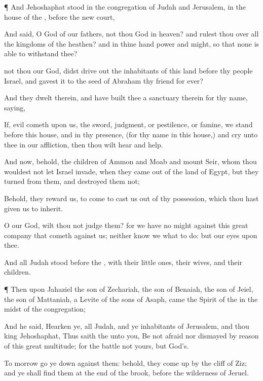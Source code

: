 {\par }{\PP {}¶ And
Jehoshaphat
stood in the
congregation of
Judah and
Jerusalem, in the
house of the
{},
before the
new
court,

And
said, O
{}
God of our
fathers,
{} not thou
God in
heaven? and
rulest
{} thou over all the
kingdoms of the
heathen? and in thine
hand
{}
power and
might, so that none is able to
withstand thee?

 not thou our
God,
{} didst drive
out the
inhabitants of this
land
before thy
people
Israel, and
gavest it to the
seed of
Abraham thy
friend for
ever?

And they
dwelt therein, and have
built thee a
sanctuary therein for thy
name,
saying,

If,
{}
evil
cometh upon us,
{} the
sword,
judgment, or
pestilence, or
famine, we
stand
before this
house, and in thy
presence, (for thy
name
{} in this
house,) and
cry unto thee in our
affliction, then thou wilt
hear and
help.

And now, behold, the
children of
Ammon and
Moab and
mount
Seir, whom thou wouldest not
let
Israel
invade, when they came
out of the
land of
Egypt, but they
turned from them, and
destroyed them not;

Behold,
{} they
reward us, to
come to cast us
out of thy
possession, which thou hast given us to
inherit.

O our
God, wilt thou not
judge them? for we have no
might
against this
great
company that
cometh against us; neither
know
we what to
do: but our
eyes
{} upon thee.

And all
Judah
stood
before the
{},
with their little
ones, their
wives, and their
children.


\par }{\PP {}¶ Then upon
Jahaziel the
son of
Zechariah, the
son of
Benaiah, the
son of
Jeiel, the
son of
Mattaniah, a
Levite of the
sons of
Asaph, came the
Spirit of the
{} in the
midst of the
congregation;

And he
said,
Hearken ye, all
Judah, and ye
inhabitants of
Jerusalem, and thou
king
Jehoshaphat, Thus
saith the
{} unto you, Be not
afraid nor
dismayed by
reason of this
great
multitude; for the
battle
{} not yours, but
God’s.

To
morrow go ye
down against them: behold, they come
up by the
cliff of
Ziz; and ye shall
find them at the
end of the
brook,
before the
wilderness of
Jeruel.

}
